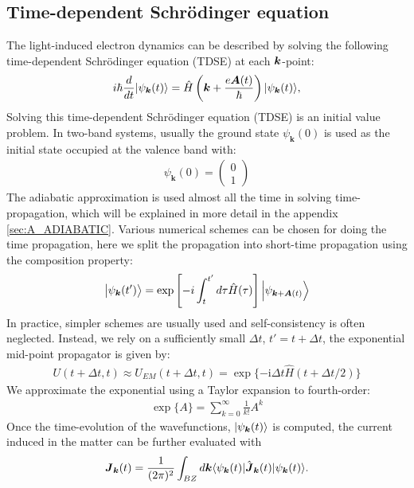 \subsection{Time-dependent Schr\"odinger equation}
The light-induced electron dynamics can be described by solving the following time-dependent Schr\"odinger equation (\gls {TDSE}) at each $\boldsymbol k$-point:
\begin{equation}
i\hbar \frac{d}{dt}| \psi_{\boldsymbol {k}}(t) \rangle = \hat{H}\left ( \boldsymbol k + \frac{e\boldsymbol A(t)}{\hbar} \right )| \psi_{\boldsymbol k}(t) \rangle,
\label{eqn:TDSE}
\end{equation}
Solving this time-dependent Schr\"odinger equation (\gls {TDSE}) is an initial value problem. In two-band systems, usually the ground state $\psi_{\boldsymbol k}(0)$ is used as the initial state occupied at the valence band with:
\begin{align}
\psi_{\boldsymbol k}(0) = \left(\begin{array}{cc}
0 \\
1
\end{array}\right)
\end{align}
The adiabatic approximation is used almost all the time in solving time-propagation, which will be explained in more detail in the appendix \ref{sec:A_ADIABATIC}. Various numerical schemes can be chosen for doing the time propagation, here we split the propagation into short-time propagation using the composition property:
\begin{equation}
\left|\psi_{\boldsymbol{k}}(t')\right\rangle=\exp \left[-i \int_{t}^{t'} d \tau \hat{H}(\tau) \right]\left|\psi_{\boldsymbol{k}+\boldsymbol{A}(t)}\right\rangle
\label{eqn:Houston}
\end{equation}
In practice, simpler schemes are usually used and self-consistency is often neglected. Instead, we rely on a sufficiently small $\Delta t$, $t'=t+\Delta t$, the exponential mid-point propagator is given by:
\begin{align}
    U(t+\Delta t, t) \approx U_{E M}(t+\Delta t, t)=\exp \{-\mathrm{i} \Delta t \hat{H}(t+\Delta t / 2)\}
\end{align}
We approximate the exponential using a Taylor expansion to fourth-order:
\begin{align}
    \exp \{A\}=\sum_{k=0}^{\infty} \frac{1}{k!} A^k
\end{align}
Once the time-evolution of the wavefunctions, $|\psi_{\boldsymbol k}(t)\rangle$ is computed, the current induced in the matter can be further evaluated with
\begin{align}
\boldsymbol{J}_{\boldsymbol k}(t)=\frac{1}{(2\pi)^2} \int_{BZ} d\boldsymbol k\langle \psi_{\boldsymbol k}(t)|\hat{\boldsymbol J}_{\boldsymbol k}(t)| \psi_{\boldsymbol{k}}(t)\rangle.
\label{eq:current}
\end{align}
